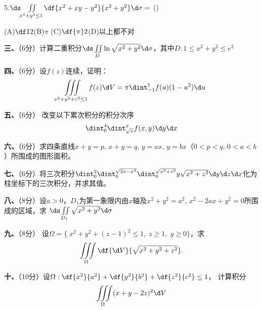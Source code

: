 5.\;$\ds\iint\limits_{x^4+y^4\leq1}\df{x^2+xy-y^2}{x^2+y^2}\d\sigma=$
(\underline{\hspace{1cm}})

  \quad(A)$\df12$\hspace{1cm}(B)$\pi$\hspace{1cm}
  (C)$\df{\pi}2$\hspace{1cm}(D)以上都不对

{\bf 三、}（6分）计算二重积分$\ds\iint\limits_D\ln\sqrt{x^2+y^2}\d\sigma$，其中$D:1\leq
x^2+y^2\leq e^2$

\bigskip

{\bf 四、}（6分）设$f(z)$连续，证明：
$$\iiint\limits_{x^2+y^2+z^2\leq 1}f(z)\d V=\pi\dint_{-1}^1f(u)(1-u^2)\d u$$

\bigskip


{\bf 五、}（6分）
改变以下累次积分的积分次序
$$\dint_0^4\dint_{\sqrt x}^xf(x,y)\d y\d x$$

\bigskip

{\bf 六、}（6分）求四条直线$x+y=p,\,x+y=q,\,y=ax,\,y=bx$（$0<p<q,\,0<a<b$）所围成的图形面积。

\bigskip

{\bf 七、}（6分）将三次积分$\dint_0^2\dint_0^{\sqrt{2x-x^2}}\dint_0
^{\sqrt{x^2+z^2}}y\sqrt{x^2+z^2}\d
y\d z\d x$化为柱坐标下的三次积分，并求其值。

\bigskip

{\bf 八、}（8分）设$a>0$，$D_1$为第一象限内由$x$轴及$x^2+y^2=a^2,\,x^2-2ax+y^2=0$所围成的区域，求
$\ds\iint\limits_{D_1}\sqrt{x^2+y^2}\d\sigma$


\bigskip

{\bf 九、}（8分）
设$\Omega=\{\;x^2+y^2+(z-1)^2\leq1,\;z\geq 1,\;y\geq 0\}$，求
$$\iiint\limits_{\Omega}\df{\d V}{\sqrt{x^2+y^2+z^2}}.$$

\bigskip


{\bf 十、}（10分）设$\Omega:\df{x^2}{a^2}+\df{y^2}{b^2}+\df{z^2}{c^2}\leq 1$，
计算积分
$$\iiint\limits_{\Omega}(x+y-2z)^2\d V$$

